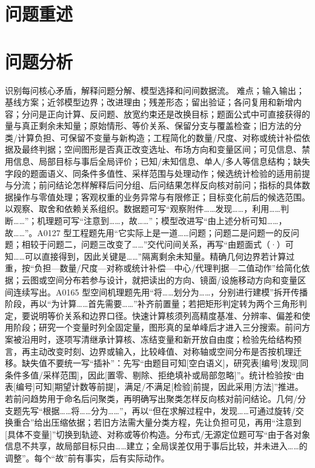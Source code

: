 \documentclass[withoutpreface,bwprint]{cumcmthesis}
\newif\ifmcmguidance
\newcommand{\MCMGuideField}[2]{\par\noindent\textbf{#1：}#2}
\newcommand{\MCMGuide}[7]{%
  \ifmcmguidance
    \begin{mcmguidebox}
      \small\color{black}
      {\color{mcmguidehead}\bfseries 写作指引}
      \MCMGuideField{目标}{#1}
      \MCMGuideField{必备清单}{#2}
      \MCMGuideField{语言风格}{#3}
      \MCMGuideField{篇幅与排版}{#4}
      \MCMGuideField{图表位置}{#5}
      \MCMGuideField{高分点}{#6}
      \MCMGuideField{错误警示}{#7}
    \end{mcmguidebox}
  \fi
}
\newcommand{\MCMRestatementLength}{问题重述检出 57/59，跨度参考 1 [1,1] 页}
\begin{document}
\section{问题重述}
\MCMGuide
  {用自己的话把题面重组为可建模的输入、输出、限制和提交任务，使读者不回看题面也能明白研究对象。}
  {研究对象；已知量；各问输出；硬性约束；附件与结果文件要求；问题间依赖。}
  {客观转述，删去与求解无关的背景，使用“给定……求……”和“在……约束下确定……”；不照抄题面句子。}
  {\MCMRestatementLength；通常控制在约半页至一页，按分问列出任务，不复制大段题面。}
  {一般不插图；复杂空间关系可重绘一张带坐标和符号的示意图。}
  {重述后应能直接建立任务矩阵，并与后文标题逐一对应。}
  {遗漏单位、时间范围或提交格式；引入尚未证明的模型；原文大段照录。}

\section{问题分析}
\MCMGuide
  {识别每问核心矛盾，解释问题分解、模型选择和问间数据流。}
  {难点；输入输出；基线方案；近邻模型边界；改进理由；残差形态；留出验证；各问复用和新增内容；分问是正向计算、反问题、放宽约束还是改换目标；题面公式中可直接获得的量与真正剩余未知量；原始情形、等价关系、保留分支与覆盖检查；旧方法的分类/计算负担、可保留不变量与新构造；工程简化的数量/尺度、对称或统计补偿依据及最终判据；空间图形是否真正改变选址、布场方向和变量区间；可见信息、禁用信息、局部目标与事后全局评价；已知/未知信息、单人/多人等信息结构；缺失字段的题面语义、同条件多值性、采样范围与处理动作；候选统计检验的适用前提与分流；前问结论怎样解释后问分组、后问结果怎样反向核对前问；指标的具体数据操作与零值处理；客观权重的业务异常与有限修正；目标变化前后的候选范围。}
  {以观察、取舍和依赖关系组织。数据题可写“观察附件……发现……，利用……判断……”；机理题可写“注意到……，故……”；模型改进写“由上述分析可知……，故……”。A0127 型工程题先用“它实际上是一道……问题；问题二是问题一的反问题；相较于问题二，问题三改变了……”交代问间关系，再写“由题面式（·）可知……可以直接得到，因此关键是……”隔离剩余未知量。精确几何边界若计算过重，按“负担—数量/尺度—对称或统计补偿—中心/代理判据—二值动作”给简化依据；云图或空间分布若参与设计，就把读出的方向、镜面/设施移动方向和变量区间连续写出。A0165 型空间机理题先用“将……划分为……，分别进行建模”拆开传播阶段，再以“为计算……首先需要……”补齐前置量；若把矩形判定转为两个三角形判定，要说明等价关系和边界口径。快速计算核须列高精度基准、分辨率、偏差和使用阶段；研究一个变量时列全固定量，图形真的呈单峰后才进入三分搜索。前问方案被沿用时，逐项写清继承计算核、冻结变量和新开放自由度；检验先给结构预言，再主动改变时刻、边界或输入，比较峰值、对称轴或空间分布是否按机理迁移。缺失值不要统一写“插补”：先写“由题目可知[空白语义]，研究表[编号]发现[同条件多值/采样范围]，因此[置零、剔除、拒绝填补或局部忽略]”。统计检验按“由表[编号]可知[期望计数等前提]，满足/不满足[检验]前提，因此采用[方法]”推进。若前问趋势用于命名后问聚类，再明确写出聚类怎样反向核对前问结论。几何/分支题先写“根据……将……分为……”，再以“但在求解过程中，发现……可通过旋转/交换重合”给出压缩依据；若旧方法需大量分类方程，先让负担可见，再用“注意到[具体不变量]”切换到轨迹、对称或等价构造。分布式/无源定位题可写“由于各对象信息不共享，故局部目标只由……建立；全局误差仅用于事后比较，并未进入……的调整”。每个“故”前有事实，后有实际动作。}
\end{document}
